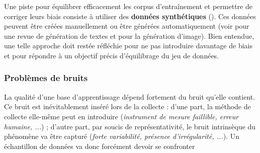 			\begin{leftBarIdea}
				Une piste pour équilibrer efficacement les corpus d'entraînement et permettre de corriger leurs biais consiste à utiliser des \textbf{données synthétiques} (\cite{jaipuria-etal:2020:deflating-dataset-bias}).
				Ces données peuvent être créées manuellement ou être générées automatiquement (voir \cite{shorten-etal:2021:text-data-augmentation} pour une revue de génération de textes et \cite{shorten-khoshgoftaar:2019:survey-image-data} pour la génération d'image).
				Bien entendue, une telle approche doit restée réfléchie pour ne pas introduire davantage de biais et pour répondre à un objectif précis d'équilibrage du jeu de données.
			\end{leftBarIdea}
		
		
		\subsubsection{Problèmes de bruits}
		\label{section:2.3.1.B-DEFIS-ANNOTATION-ASPECT-DONNEES-BRUITS}
		
			La qualité d'une base d'apprentissage dépend fortement du bruit qu'elle contient.
			Ce bruit est inévitablement inséré lors de la collecte :
			d'une part, la méthode de collecte elle-même peut en introduire (\textit{instrument de mesure faillible, erreur humaine, ...}) ;
			d'autre part, par soucis de représentativité, le bruit intrinsèque du phénomène va être capturé (\textit{forte variabilité, présence d'irrégularité, ...}).
			Un échantillon de données va donc forcément devoir se confronter 

